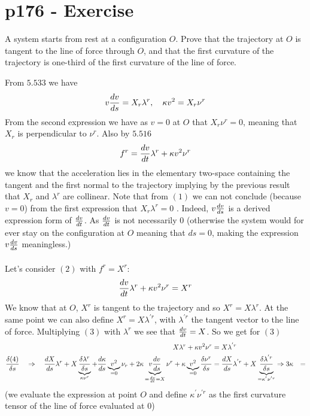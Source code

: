 \section{p176 - Exercise}
\begin{tcolorbox}
A system starts from rest at a configuration $O$. Prove that the trajectory at $O$ is tangent to the line of force through $O$, and that the first curvature of the trajectory is one-third of the first curvature of the line of force.
\end{tcolorbox}
From $\mathbf{5.533}$ we have 
\begin{align}
v\dv{v}{s}= X_r\lambda^r, \quad \kappa v^2=X_r\nu^r
\end{align}
From the second expression we have as $v=0$ at $O$ that $X_r\nu^r=0$, meaning that $X_r$ is perpendicular to $\nu^r$.
Also by $\mathbf{5.516}$
\begin{align}
f^r = \dv{v}{t}\lambda^r + \kappa v^2 \nu^r
\end{align}
we know that the acceleration lies in the elementary two-space containing the tangent and the first normal to the trajectory implying by the previous result that $X_r$ and $\lambda^r$ are collinear.
Note that from $(1)$ we can not conclude (because $v=0$) from the first expression  that $X_r\lambda^r=0$ . Indeed, $v\dv{v}{s}$ is a derived expression form of $\dv{v}{t}$. As $\dv{v}{t}$ is not necessarily $0$ (otherwise the system would for ever  stay on the configuration at $O$ meaning that $ds=0$, making the expression $v\dv{v}{s}$ meaningless.)
\\\\
Let's consider  $(2)$ with $f^r=X^r$:
\begin{align}
\dv{v}{t}\lambda^r + \kappa v^2 \nu^r= X^r
\end{align}
We know that at $O$, $X^r$ is tangent to the trajectory and so $X^r = X\lambda^r$. At the same point we can also define $X^r = X\lambda^{'r}$, with $\lambda^{'r}$ the tangent vector to the line of force.
Multiplying $(3)$ with $\lambda^r$ we see that $\dv{v}{t} = X$. 
So we get for $(3)$
\begin{align}
X\lambda^r + \kappa v^2 \nu^r&= X\lambda^{'r}\\
\frac{\delta\text{(4)}}{\delta s}\quad\Rightarrow\quad  \dv{X}{s}\lambda^r +X\underbrace{\frac{\delta \lambda^r}{\delta s}}_{\kappa\nu^r}+\dv{\kappa}{s}\underbrace{v^2}_{=0}\nu_r + 2\kappa \underbrace{v\dv{v}{s}}_{=\dv{v}{t}=X} \nu^r+\kappa \underbrace{v^2}_{=0}\frac{\delta \nu^r}{\delta s}&= \dv{X}{s}\lambda^{'r}+X\underbrace{\frac{\delta \lambda^{'r}}{\delta s}}_{=\kappa^{'} \nu^{'r}}\Rightarrow 3\kappa&= 
\end{align}
(we evaluate the expression at point $O$ and define $\kappa^{'}\nu^{'r}$ as the first curvature tensor  of the line of force evaluated at $0$)

